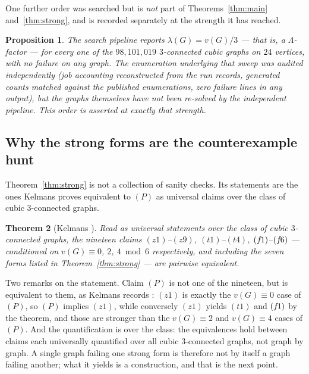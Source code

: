 \documentclass[11pt]{amsart}
\newcommand{\Lam}{\Lambda}
\newcommand{\vv}{v}
\theoremstyle{plain}
\newtheorem{theorem}{Theorem}[section]
\newtheorem{proposition}[theorem]{Proposition}
\theoremstyle{definition}
\theoremstyle{remark}
\begin{document}
One further order was searched but is \emph{not} part of
Theorems~\ref{thm:main} and~\ref{thm:strong}, and is recorded separately
at the strength it has reached.

\begin{proposition}\label{prop:n24}
The search pipeline reports $\lambda(G)=\vv(G)/3$ --- that is, a
$\Lam$-factor --- for every one of the $98{,}101{,}019$ $3$-connected
cubic graphs on $24$ vertices, with no failure on any graph. The
enumeration underlying that sweep was audited independently (job
accounting reconstructed from the run records, generated counts matched
against the published enumerations, zero failure lines in any output),
but the graphs themselves have not been re-solved by the independent
pipeline. This order is asserted at exactly that strength.
\end{proposition}

\subsection{Why the strong forms are the counterexample hunt}
\label{ssec:strong}
Theorem~\ref{thm:strong} is not a collection of sanity checks. Its
statements are the ones Kelmans proves equivalent to $(P)$ as universal
claims over the class of cubic $3$-connected graphs.

\begin{theorem}[Kelmans {\cite[3.1]{Kel11}}]\label{thm:kelmans}
Read as universal statements over the class of cubic $3$-connected
graphs, the nineteen claims $(z1)$--$(z9)$, $(t1)$--$(t4)$,
$(f\mkern-2mu1)$--$(f\mkern-2mu6)$ --- conditioned on $\vv(G)\equiv0$,
$2$, $4 \bmod 6$ respectively, and including the seven forms listed in
Theorem~\ref{thm:strong} --- are pairwise equivalent.
\end{theorem}

\noindent Two remarks on the statement. Claim $(P)$ is not one of the
nineteen, but is equivalent to them, as Kelmans records
\cite[\S1]{Kel11}: $(z1)$ is exactly the $\vv(G)\equiv0$ case of $(P)$,
so $(P)$ implies $(z1)$, while conversely $(z1)$ yields $(t1)$ and
$(f\mkern-2mu1)$ by the theorem, and those are stronger than the
$\vv(G)\equiv 2$ and $\vv(G)\equiv 4$ cases of $(P)$. And the
quantification is over the class: the equivalences hold between claims
each universally quantified over all cubic $3$-connected graphs, not
graph by graph. A single graph failing one strong form is therefore not
by itself a graph failing another; what it yields is a construction, and
that is the next point.
\end{document}
